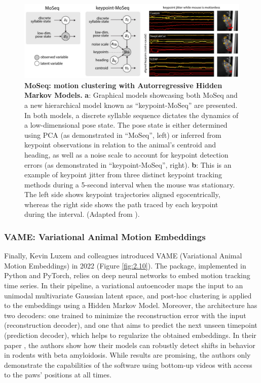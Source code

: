 \begin{figure}[!thb]
\centering
\includegraphics[width=\textwidth]{Figures/sota_9.pdf}

\caption[\textbf{MoSeq: motion clustering with Autorregressive Hidden Markov Models}]{\textbf{MoSeq: motion clustering with Autorregressive Hidden Markov Models.} \textbf{a}: Graphical models showcasing both MoSeq and a new hierarchical model known as “keypoint-MoSeq” are presented. In both models, a discrete syllable sequence dictates the dynamics of a low-dimensional pose state. The pose state is either determined using PCA (as demonstrated in “MoSeq”, left) or inferred from keypoint observations in relation to the animal’s centroid and heading, as well as a noise scale to account for keypoint detection errors (as demonstrated in “keypoint-MoSeq”, right). \textbf{b}: This is an example of keypoint jitter from three distinct keypoint tracking methods during a 5-second interval when the mouse was stationary. The left side shows keypoint trajectories aligned egocentrically, whereas the right side shows the path traced by each keypoint during the interval. (Adapted from \cite{Weinreb2023Keypoint-MoSeq:Dynamics}).}
\label{fig:2.9}

\end{figure}

\subsubsection{VAME: Variational Animal Motion Embeddings}

Finally, Kevin Luxem and colleagues introduced VAME (Variational Animal Motion Embeddings) in 2022 (Figure \ref{fig:2.10}). The package, implemented in Python and PyTorch, relies on deep neural networks to embed motion tracking time series. In their pipeline, a variational autoencoder maps the input to an unimodal multivariate Gaussian latent space, and post-hoc clustering is applied to the embeddings using a Hidden Markov Model. Moreover, the architecture has two decoders: one trained to minimize the reconstruction error with the input (reconstruction decoder), and one that aims to predict the next unseen timepoint (prediction decoder), which helps to regularize the obtained embeddings. In their paper \cite{Luxem2022IdentifyingMotion}, the authors show how their models can robustly detect shifts in behavior in rodents with beta amyloidosis. While results are promising, the authors only demonstrate the capabilities of the software using bottom-up videos with access to the paws' positions at all times.

